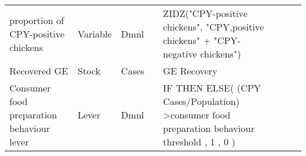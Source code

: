 \begin{landscape}
\begin{longtable}[c]{m{10em}lllm{15em}lll}
proportion of CPY-positive chickens           & Variable & Dmnl                     &                           & ZIDZ("CPY-positive chickens", "CPY,positive chickens" + "CPY-negative chickens")                                                                                                                                                                                                         &                                                                                                                                                                                              &                                                                                                                                                                                                                                       \\
Recovered GE                                  & Stock    & Cases                    &                           & GE Recovery                                                                                                                                                                                                                                                                              &                                                                                                                                                                                              &                                                                                                                                                                                                                                       \\
Consumer food preparation behaviour lever     & Lever    & Dmnl                     &                           & IF THEN ELSE(  (CPY Cases/Population) \textgreater consumer food preparation behaviour threshold , 1 , 0 )                                                                                                                                                                               &                                                                                                                                                                                              &                                                                                                                                                                                                                                       \\

\end{longtable}
\end{landscape}
